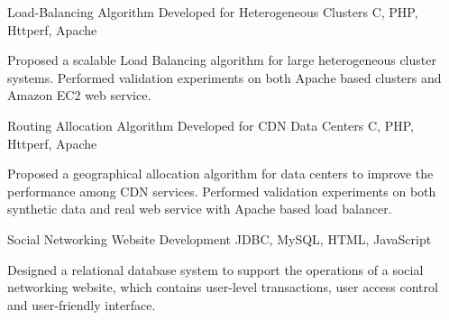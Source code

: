 \begin{cventries}
\projentry
{Load-Balancing Algorithm Developed for Heterogeneous Clusters} %
{C, PHP, Httperf, Apache} %
{ %
\begin{cvitems}
\item{Proposed a scalable Load Balancing algorithm for large heterogeneous cluster systems. Performed validation experiments on both Apache based clusters and Amazon EC2 web service.}
\end{cvitems}
}


\projentry
{Routing Allocation Algorithm Developed for CDN Data Centers} %
{C, PHP, Httperf, Apache} %
{ %
\begin{cvitems}
\item{Proposed a geographical allocation algorithm for data centers to improve the performance among CDN services. Performed validation experiments on both synthetic data and real web service with Apache based load balancer.}
\end{cvitems}
}


\projentry
{Social Networking Website Development} %
{JDBC, MySQL, HTML, JavaScript} %
{ %
\begin{cvitems}
\item{Designed a relational database system to support the operations of a social networking website, which contains user-level transactions, user access control and user-friendly interface.}
\end{cvitems}
}

\end{cventries}